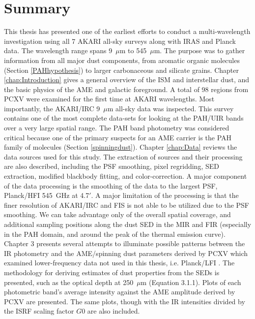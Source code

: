 \chapter{Summary
  \label{chap:Summary}}
     This thesis has presented one of the earliest efforts to conduct a multi-wavelength investigation using all 7 AKARI all-sky surveys along with IRAS and Planck data. The wavelength range spans 9~$\mu$m to 545~$\mu$m. The purpose was to gather information from all major dust components, from aromatic organic molecules (Section \ref{PAHhypothesis}) to larger carbonaceous and silicate grains. Chapter \ref{chap:Introduction} gives a general overview of the ISM and interstellar dust, and the basic physics of the AME and galactic foreground.
     A total of 98 regions from PCXV were examined for the first time at AKARI wavelengths. Most importantly, the AKARI/IRC 9~$\mu$m all-sky data was inspected. This survey contains one of the most complete data-sets for looking at the PAH/UIR bands over a very large spatial range. The PAH band photometry was considered critical because one of the primary suspects for an AME carrier is the PAH family of molecules (Section \ref{spinningdust}).
     Chapter \ref{chap:Data} reviews the data sources used for this study. The extraction of sources and their processing are also described, including the PSF smoothing, pixel regridding, SED extraction, modified blackbody fitting, and color-correction. A major component of the data processing is the smoothing of the data to the largest PSF, Planck/HFI 545~GHz at 4.7$'$. A major limitation of the processing is that the finer resolution of AKARI/IRC and FIS is not able to be utilized due to the PSF smoothing. We can take advantage only of the overall spatial coverage, and additional sampling positions along the dust SED in the MIR and FIR (especially in the PAH domain, and around the peak of the thermal emission curve). 
     Chapter 3 presents several attempts to illuminate possible patterns between the IR photometry and the AME/spinning dust parameters derived by PCXV which examined lower-frequency data not used in this thesis, i.e. Planck/LFI \citep{lfi14ii}. The methodology for deriving estimates of dust properties from the SEDs is presented, such as the optical depth at 250~$\mu$m (Equation 3.1.1). Plots of each photometric band's average intensity against the AME amplitude derived by PCXV are presented. The same plots, though with the IR intensities divided by the ISRF scaling factor $G0$ are also included.
